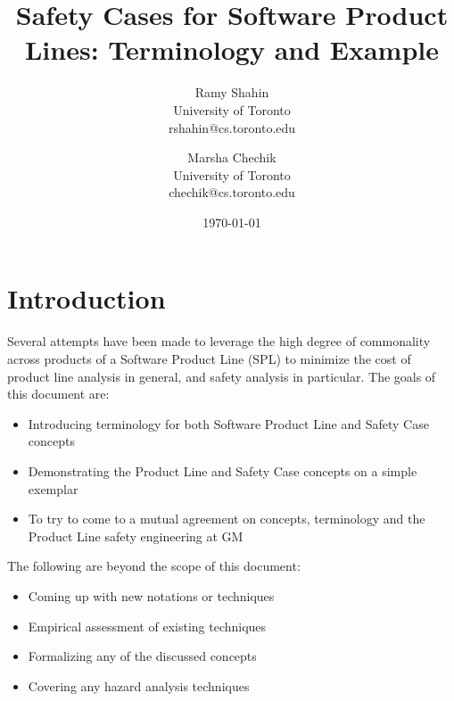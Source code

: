 \documentclass[11pt]{article}
\title{Safety Cases for Software Product Lines: Terminology and Example}
\author{Ramy Shahin \\ University of Toronto \\ rshahin@cs.toronto.edu \and
Marsha Chechik \\ University of Toronto \\ chechik@cs.toronto.edu}
\date{\today}                                           %
\begin{document}
\maketitle


\section{Introduction}



Several attempts have been made to leverage the high degree of commonality across products of a Software Product Line (SPL) to minimize the cost of product line analysis in general, and safety analysis in particular. The goals of this document are:

\begin{itemize}
\item Introducing terminology for both Software Product Line and Safety Case concepts
\item Demonstrating the Product Line and Safety Case concepts on a simple exemplar
\item To try to come to a mutual agreement on concepts, terminology and the Product Line safety engineering at GM
\end{itemize}

The following are beyond the scope of this document:

\begin{itemize}
\item Coming up with new notations or techniques
\item Empirical assessment of existing techniques
\item Formalizing any of the discussed concepts
\item Covering any hazard analysis techniques
\end{itemize}
\end{document}
